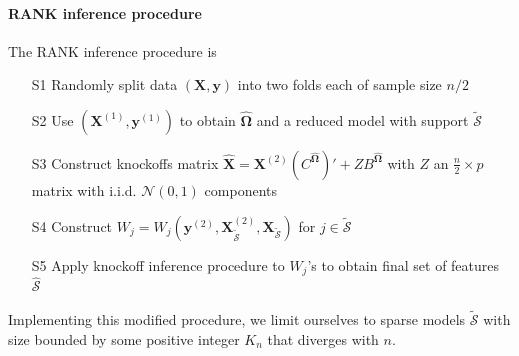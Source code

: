 \documentclass[twoside]{article}
\begin{document}
\paragraph*{RANK inference procedure} 
The RANK inference procedure is
\begin{itemize}
    \item[S1] Randomly split data $(\mathbf{X,y})$ into two folds each of sample size $n/2$
    \item[S2] Use $(\mathbf{X}^{(1)},\mathbf{y}^{(1)})$ to obtain $\hat{\boldsymbol{\Omega}}$ and a reduced model with support $\tilde{\mathcal{S}}$
    \item[S3] Construct knockoffs matrix $\hat{\mathbf{X}} = \mathbf{X}^{(2)}(C^{\hat{\boldsymbol{\Omega}}})' + ZB^{\hat{\boldsymbol{\Omega}}}$ with $Z$ an $\frac{n}{2}\times p$ matrix with i.i.d. $\mathcal{N}(0,1)$ components 
    \item[S4] Construct $W_j = W_j(\mathbf{y}^{(2)},\mathbf{X}^{(2)}_{\tilde{\mathcal{S}}},\mathbf{X}_{\tilde{\mathcal{S}}})$ for $j\in \tilde{\mathcal{S}}$
    \item[S5] Apply knockoff inference procedure to $W_j$'s to obtain final set of features $\hat{\mathcal{S}}$
\end{itemize}
Implementing this modified procedure, we limit ourselves to sparse models $\tilde{\mathcal{S}}$ with size bounded by some positive integer $K_n$ that diverges with $n$.

\newpage


\end{document}
